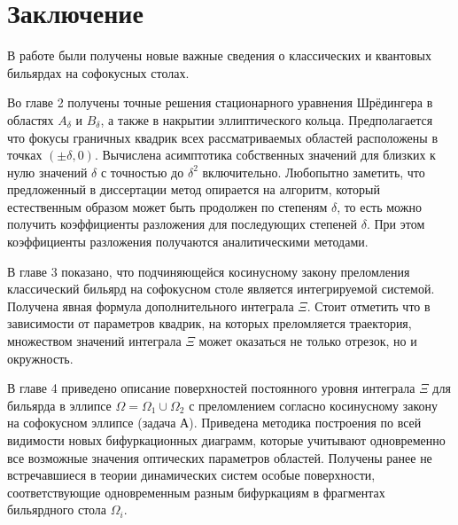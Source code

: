 \chapter*{Заключение}                       %

В работе были получены новые важные сведения о классических и квантовых бильярдах на софокусных столах.

Во главе 2 получены точные решения стационарного уравнения Шрёдингера в областях $A_\delta$ и $B_\delta$, а также в накрытии эллиптического кольца. Предполагается что фокусы граничных квадрик всех рассматриваемых областей расположены в точках $(\pm \delta,0)$. Вычислена асимптотика собственных значений для  близких к нулю значений $\delta$ с точностью до $\delta^2$ включительно. 
Любопытно заметить, что предложенный в диссертации метод опирается на алгоритм, который естественным образом может быть продолжен по степеням $\delta$, то есть можно получить коэффициенты разложения для последующих степеней $\delta$. При этом коэффициенты разложения  получаются аналитическими методами. 

В главе 3 показано, что подчиняющейся косинусному закону преломления классический бильярд на софокусном столе является интегрируемой системой. 
Получена явная формула дополнительного интеграла $\Xi$. Стоит отметить что в зависимости от параметров квадрик, на которых преломляется траектория, множеством значений интеграла $\Xi$ может оказаться не только отрезок, но и окружность. 

В главе 4 приведено описание поверхностей постоянного уровня интеграла $\Xi$ для бильярда в эллипсе $\Omega = \Omega_1 \cup \Omega_2$ с преломлением согласно косинусному закону на софокусном эллипсе (задача А).
Приведена методика построения по всей видимости новых бифуркационных  диаграмм, которые учитывают одновременно все возможные значения оптических параметров областей. 
Получены ранее не встречавшиеся в теории динамических систем особые поверхности, соответствующие одновременным разным бифуркациям в фрагментах бильярдного стола $\Omega_i$. 

